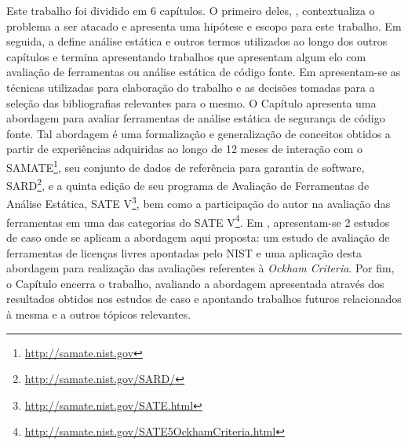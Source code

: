 Este trabalho foi dividido em 6 capítulos. O primeiro deles, , contextualiza o problema a ser atacado e apresenta uma hipótese e escopo para este trabalho. Em seguida, a  define análise estática e outros termos utilizados ao longo dos outros capítulos e termina apresentando trabalhos que apresentam algum elo com avaliação de ferramentas ou análise estática de código fonte. Em  apresentam-se as técnicas utilizadas para elaboração do trabalho e as decisões tomadas para a seleção das bibliografias relevantes para o mesmo. O Capítulo  apresenta uma abordagem para avaliar ferramentas de análise estática de segurança de código fonte. Tal abordagem é uma formalização e generalização de conceitos obtidos  a partir de experiências adquiridas ao longo de 12 meses de interação com o SAMATE\footnote{\url{http://samate.nist.gov}}, seu conjunto de dados de referência para garantia de software, SARD\footnote{\url{http://samate.nist.gov/SARD/}}, e a quinta edição de seu programa de Avaliação de Ferramentas de Análise Estática, SATE V\footnote{\url{http://samate.nist.gov/SATE.html}}, bem como a participação do autor na avaliação das ferramentas em uma das categorias do SATE V\footnote{\url{http://samate.nist.gov/SATE5OckhamCriteria.html}}. Em , apresentam-se 2 estudos de caso onde se aplicam a abordagem aqui proposta: um estudo de avaliação de ferramentas de licenças livres apontadas pelo NIST e uma aplicação desta abordagem para realização das avaliações referentes à \textit{Ockham Criteria}. Por fim, o Capítulo  encerra o trabalho, avaliando a abordagem apresentada através dos resultados obtidos nos estudos de caso e apontando trabalhos futuros relacionados à mesma e a outros tópicos relevantes.
